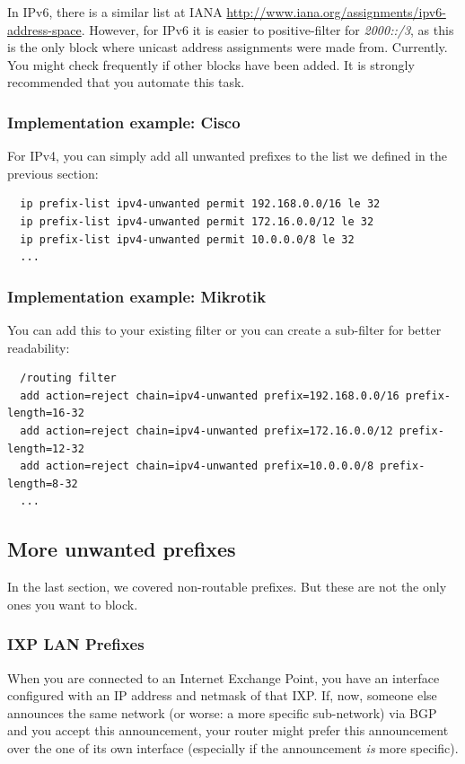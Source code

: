 In IPv6, there is a similar list at IANA \url{http://www.iana.org/assignments/ipv6-address-space}. However, for IPv6 it is easier to positive-filter for \emph{2000::/3}, as this is the only block where unicast address assignments were made from. Currently. You might check frequently if other blocks have been added. It is strongly recommended that you automate this task.

\subsubsection{Implementation example: Cisco}
For IPv4, you can simply add all unwanted prefixes to the list we defined in the previous section:
\begin{verbatim}
  ip prefix-list ipv4-unwanted permit 192.168.0.0/16 le 32
  ip prefix-list ipv4-unwanted permit 172.16.0.0/12 le 32
  ip prefix-list ipv4-unwanted permit 10.0.0.0/8 le 32
  ...
\end{verbatim}

\subsubsection{Implementation example: Mikrotik}
You can add this to your existing filter or you can create a sub-filter for better readability:
\begin{verbatim}
  /routing filter
  add action=reject chain=ipv4-unwanted prefix=192.168.0.0/16 prefix-length=16-32
  add action=reject chain=ipv4-unwanted prefix=172.16.0.0/12 prefix-length=12-32
  add action=reject chain=ipv4-unwanted prefix=10.0.0.0/8 prefix-length=8-32
  ...
\end{verbatim}

\subsection{More unwanted prefixes}
In the last section, we covered non-routable prefixes. But these are not the only ones you want to block.

\subsubsection{IXP LAN Prefixes}
When you are connected to an Internet Exchange Point, you have an interface configured with an IP address and netmask of that IXP. If, now, someone else announces the same network (or worse: a more specific sub-network) via BGP and you accept this announcement, your router might prefer this announcement over the one of its own interface (especially if the announcement \emph{is} more specific).

